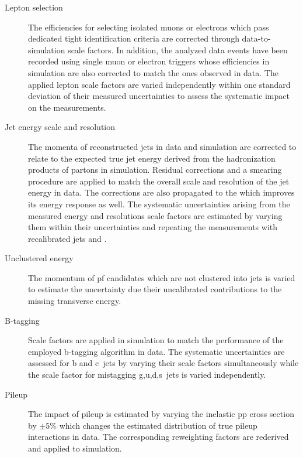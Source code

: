 \begin{description}
\item[Lepton selection] The efficiencies for selecting isolated muons or electrons which pass dedicated tight identification criteria are corrected through data-to-simulation scale factors. In addition, the analyzed data events have been recorded using single muon or electron triggers whose efficiencies in simulation are also corrected to match the ones observed in data. The applied lepton scale factors are varied independently within one standard deviation of their measured uncertainties to assess the systematic impact on the measurements.
\item[Jet energy scale and resolution] The momenta of reconstructed jets in data and simulation are corrected to relate to the expected true jet energy derived from the hadronization products of partons in simulation. Residual corrections and a smearing procedure are applied to match the overall scale and resolution of the jet energy in data. The corrections are also propagated to the \met which improves its energy response as well. The systematic uncertainties arising from the measured energy and resolutions scale factors are estimated by varying them within their uncertainties and repeating the measurements with recalibrated jets and \met.
\item[Unclustered energy] The momentum of \gls{pf} candidates which are not clustered into jets is varied to estimate the uncertainty due their uncalibrated contributions to the missing transverse energy.
\item[B-tagging] Scale factors are applied in simulation to match the performance of the employed b-tagging algorithm in data. The systematic uncertainties are assessed for b and c~jets by varying their scale factors simultaneously while the scale factor for mistagging g,u,d,s~jets is varied independently.
\item[Pileup] The impact of pileup is estimated by varying the inelastic \gls{pp} cross section by $\pm5\%$ which changes the estimated distribution of true pileup interactions in data. The corresponding reweighting factors are rederived and applied to simulation.
\end{description}

